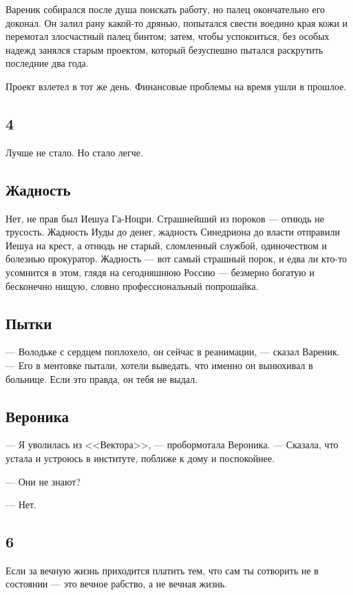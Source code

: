 Вареник собирался после душа поискать работу, но палец окончательно его доконал.
Он залил рану какой-то дрянью, попытался свести воедино края кожи и перемотал злосчастный палец бинтом;
затем, чтобы успокоиться, без особых надежд занялся старым проектом, который безуспешно пытался раскрутить последние два года.

Проект взлетел в тот же день.
Финансовые проблемы на время ушли в прошлое.


\subsection{4}

Лучше не стало.
Но стало легче.

\subsection{Жадность}

Нет, не прав был Иешуа Га-Ноцри.
Страшнейший из пороков --- отнюдь не трусость.
Жадность Иуды до денег, жадность Синедриона до власти отправили Иешуа на крест, а отнюдь не старый, сломленный службой, одиночеством и болезнью прокуратор.
Жадность --- вот самый страшный порок, и едва ли кто-то усомнится в этом, глядя на сегодняшнюю Россию --- безмерно богатую и бесконечно нищую, словно профессиональный попрошайка.

\subsection{Пытки}

--- Володьке с сердцем поплохело, он сейчас в реанимации, --- сказал Вареник.
--- Его в ментовке пытали, хотели выведать, что именно он вынюхивал в больнице.
Если это правда, он тебя не выдал.

\subsection{Вероника}

--- Я уволилась из <<Вектора>>, --- пробормотала Вероника.
--- Сказала, что устала и устроюсь в институте, поближе к дому и поспокойнее.

--- Они не знают?

--- Нет.

\subsection{6}

Если за вечную жизнь приходится платить тем, что сам ты сотворить не в состоянии --- это вечное рабство, а не вечная жизнь.
